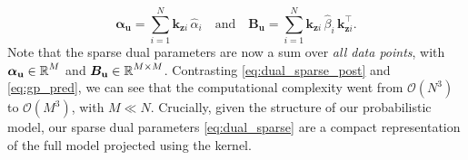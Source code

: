 \documentclass{article}
\newcommand{\dataset}{\ensuremath{\mathcal{D}}}
\newcommand{\mathbold}[1]{\bm{#1}}
\newcommand{\mbf}[1]{\mathbf{#1}}
\newcommand{\T}{\top}
\newcommand{\valpha}[0]{\mathbold{\alpha}}
\newcommand{\MBeta}[0]{\mathbold{B}}
\newcommand{\vz}{\mbf{z}}
\newcommand{\vf}{\mbf{f}}
\newcommand{\vu}{\mbf{u}}
\newcommand{\vx}{\mbf{x}}
\newcommand{\MKzz}{\mbf{K}_{\mbf{z}\mbf{z}}}
\newcommand{\MKxx}{\mbf{K}_{\mbf{x}\mbf{x}}}
\newcommand{\vkzi}{\mbf{k}_{\mbf{z}i}}
\newcommand{\vkzs}{\mbf{k}_{\mbf{z}i}}
\newcommand{\vk}{\mbf{k}}
\newcommand{\myexpect}{\mathbb{E}}
\begin{document}
%
\begin{equation} \textstyle
  \valpha_{\vu}  =  \sum_{i=1}^N  \vkzi \, \hat{\alpha}_{i}
  \quad \text{and} \quad
  \MBeta_{\vu} =  \sum_{i=1}^N \vkzi \,\hat{\beta}_{i} \, \vkzi^{\T} .
\label{eq:dual_sparse}
\end{equation}
%
Note that the sparse dual parameters are now a sum over \emph{all data points}, with $\valpha_{\vu} \in \R^{M}$ and $\MBeta_{\vu} \in \R^{M  \times M}$.
Contrasting \cref{eq:dual_sparse_post} and \cref{eq:gp_pred}, we can see that the computational complexity went from $\mathcal{O}(N^3)$ to $\mathcal{O}(M^3)$, with $M \ll N$.
Crucially, given the structure of our probabilistic model, our sparse dual parameters \cref{eq:dual_sparse} are a compact representation of the full model projected using the kernel.



\end{document}
